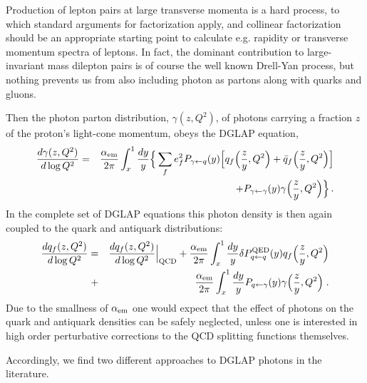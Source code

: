 Production of lepton pairs at large transverse momenta is a hard process, to which
standard arguments for factorization apply, and collinear factorization should be an appropriate starting point to calculate e.g. rapidity or transverse momentum spectra of leptons.
In fact, the dominant contribution to large-invariant mass dilepton pairs is of course the well known Drell-Yan process, but nothing prevents us from also including photon as partons along with quarks and gluons.

Then the photon parton distribution, $\gamma(z,Q^2)$, of photons carrying a fraction $z$ of the proton's
light-cone momentum, obeys the DGLAP equation,
\begin{eqnarray}
{d \gamma(z,Q^2) \over d \log Q^2} =&& {\alpha_{\rm{em}} \over 2 \pi} \int_x^1 {dy \over y} 
\Big \{ \sum_f e_f^2 P_{\gamma \leftarrow q}(y) 
\Big[ q_f \Big({z \over y}, Q^2 \Big) + \bar q_f\Big({z \over y},Q^2\Big) \Big] \nonumber \\
&&+ P_{\gamma \leftarrow \gamma}(y) \gamma\Big({z \over y},Q^2\Big) \Big \} \, .
\end{eqnarray}
In the complete set of DGLAP equations this photon density is then again coupled to the quark and antiquark
distributions:
\begin{eqnarray}
 {d q_f(z,Q^2 )\over d \log Q^2} =&& {d q_f(z,Q^2) \over d \log Q^2}\Big|_{\rm{QCD}} + {{\alpha_{\mathrm{em}}} \over 2 \pi} \int_x^1 {dy \over y} 
\delta P_{q \leftarrow q}^{\rm{QED}}(y) q_f\Big({z \over y}, Q^2\Big)
\nonumber \\
+&& {{\alpha_{\mathrm{em}}} \over 2 \pi} \int_x^1 {dy \over y}  P_{q \leftarrow \gamma}(y)
\gamma\Big({z \over y},Q^2\Big) \; . \nonumber \\
\end{eqnarray}
Due to the smallness of $\alpha_{\rm{em}}$ one would expect that the effect of photons on the quark and antiquark densities
can be safely neglected, unless one is interested in high order perturbative corrections to the QCD splitting functions
themselves.

Accordingly, we find two different approaches to DGLAP photons in the literature.


